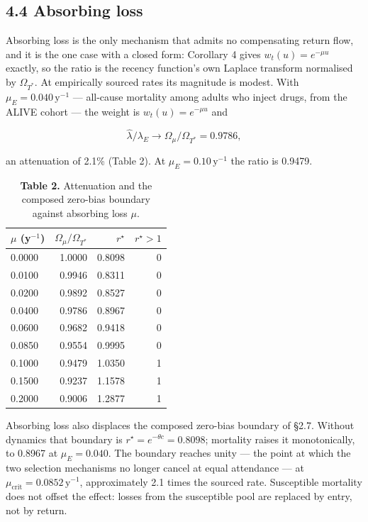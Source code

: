 \subsection{4.4 Absorbing loss}

Absorbing loss is the only mechanism that admits no compensating return flow, and it is the one case with a closed form: Corollary 4 gives \(w_t(u)=e^{-\mu u}\) exactly, so the ratio is the recency function's own Laplace transform normalised by \(\Omega_{T^*}\). At empirically sourced rates its magnitude is modest. With \(\mu_E=0.040\,\mathrm{y}^{-1}\) --- all-cause mortality among adults who inject drugs, from the ALIVE cohort --- the weight is \(w_t(u)=e^{-\mu u}\) and

\[
\hat\lambda/\lambda_E \to \Omega_\mu/\Omega_{T^*} = 0.9786 ,
\]

an attenuation of 2.1\% (Table 2). At \(\mu_E=0.10\,\mathrm{y}^{-1}\) the ratio is 0.9479.

\begin{table}[htbp]
  \centering
  \small
  \caption*{\textbf{Table 2.} Attenuation and the composed zero-bias boundary against absorbing loss $\mu$.}
  \label{tab:table_2}
  \begin{tabular}{lrrr}
    \toprule
    $\mu$ (y$^{-1}$) & $\Omega_\mu/\Omega_{T^*}$ & $r^\star$ & $r^\star>1$ \\
    \midrule
    0.0000 & 1.0000 & 0.8098 & 0 \\
    0.0100 & 0.9946 & 0.8311 & 0 \\
    0.0200 & 0.9892 & 0.8527 & 0 \\
    0.0400 & 0.9786 & 0.8967 & 0 \\
    0.0600 & 0.9682 & 0.9418 & 0 \\
    0.0850 & 0.9554 & 0.9995 & 0 \\
    0.1000 & 0.9479 & 1.0350 & 1 \\
    0.1500 & 0.9237 & 1.1578 & 1 \\
    0.2000 & 0.9006 & 1.2877 & 1 \\
    \bottomrule
  \end{tabular}
\end{table}

Absorbing loss also displaces the composed zero-bias boundary of §2.7. Without dynamics that boundary is \(r^\star=e^{-\theta c}=0.8098\); mortality raises it monotonically, to 0.8967 at \(\mu_E=0.040\). The boundary reaches unity --- the point at which the two selection mechanisms no longer cancel at equal attendance --- at \(\mu_{\mathrm{crit}}=0.0852\,\mathrm{y}^{-1}\), approximately 2.1 times the sourced rate. Susceptible mortality does not offset the effect: losses from the susceptible pool are replaced by entry, not by return.

